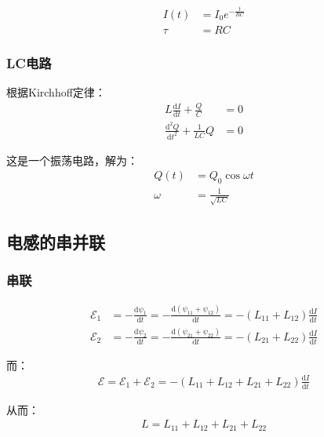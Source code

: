 \documentclass[12pt,onecolumn,a4paper]{book}
\numberwithin{table}{subsection}
\numberwithin{equation}{subsection}
\begin{document}
    \begin{align}
        I(t) & = I_0 e^{-\frac{t}{RC}} \\
        \tau & = RC
    \end{align}

    \subsubsection{LC电路}

    根据Kirchhoff定律：
    \begin{align}
        L \frac{\mathrm{d} I}{\mathrm{d} t} + \frac{Q}{C}     & = 0 \\
        \frac{\mathrm{d}^2 Q}{\mathrm{d} t^2} + \frac{1}{LC}Q & = 0
    \end{align}

    这是一个振荡电路，解为：
    \begin{align}
        Q(t)   & = Q_0 \cos \omega t   \\
        \omega & = \frac{1}{\sqrt{LC}}
    \end{align}

    \subsection{电感的串并联}

    \subsubsection{串联}
    \begin{align}
        \mathcal{E}_1 & = - \frac{\mathrm{d} \psi_1}{\mathrm{d} t} = - \frac{\mathrm{d} (\psi_{11} + \psi_{12})}{\mathrm{d} t} = - (L_{11} + L_{12}) \frac{\mathrm{d} I}{\mathrm{d} t} \\
        \mathcal{E}_2 & = - \frac{\mathrm{d} \psi_2}{\mathrm{d} t} = - \frac{\mathrm{d} (\psi_{21} + \psi_{22})}{\mathrm{d} t} = - (L_{21} + L_{22}) \frac{\mathrm{d} I}{\mathrm{d} t}
    \end{align}

    而：
    \begin{align}
        \mathcal{E} = \mathcal{E}_1 +\mathcal{E}_2 = - (L_{11} + L_{12} + L_{21} + L_{22}) \frac{\mathrm{d} I}{\mathrm{d} t}
    \end{align}

    从而：
    \begin{align}
        L = L_{11} + L_{12} + L_{21} + L_{22}
    \end{align}
\end{document}
